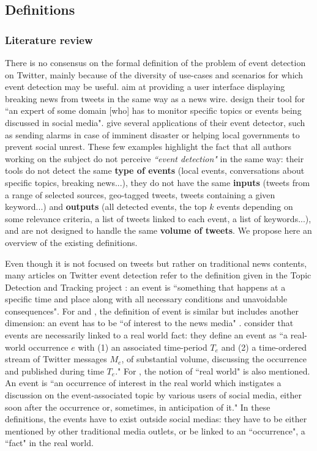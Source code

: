 \subsection{Definitions \label{Subsec: Definitions}}


\subsubsection{Literature review}
			There is no consensus on the formal definition of the problem of event detection on Twitter, mainly because of the diversity of use-cases and scenarios for which event detection may be useful. \citet{sankaranarayanan_twitterstand:_2009} aim at providing a user interface displaying breaking news from tweets in the same way as a news wire. \citet{aiello_sensing_2013} design their tool for ``an expert of some domain [who] has to monitor specific topics or events being discussed in social media". \citet{zhang_triovecevent:_2017} give several applications of their event detector, such as sending alarms in case of imminent disaster or helping local governments to prevent social unrest. These few examples highlight the fact that all authors working on the subject do not perceive \textit{``event detection"} in the same way: their tools do not detect the same \textbf{type of events} (local events, conversations about specific topics, breaking news...), they do not have the same \textbf{inputs} (tweets from a range of selected sources, geo-tagged tweets, tweets containing a given keyword...) and \textbf{outputs} (all detected events, the top $k$ events depending on some relevance criteria, a list of tweets linked to each event, a list of keywords...), and are not designed to handle the same \textbf{volume of tweets}. We propose here an overview of the existing definitions.
			
Even though it is not focused on tweets but rather on traditional news contents, many articles on Twitter event detection refer to the definition given in the Topic Detection and Tracking project \citep{allan_introduction_2002}: an event is ``something that happens at a specific time and place along with all necessary conditions and unavoidable consequences". 
For \citet{aggarwal_event_2012} and \citet{mcminn_building_2013}, the definition of event is similar but includes another dimension: an event has to be ``of interest to the news media" \citep{aggarwal_event_2012}.
\citet{becker_beyond_2011} consider that events are necessarily linked to a real world fact: they define an event as ``a real-world occurrence $e$ with (1) an associated time-period $T_e$ and (2) a time-ordered stream of Twitter messages $M_e$, of substantial volume, discussing the occurrence and published during time $T_e$."  
 For \citet{hasan_survey_2018}, the notion of ``real world" is also mentioned. An event is ``an occurrence of interest in the real world which instigates a discussion on the event-associated topic by various users of social media, either soon after the occurrence or, sometimes, in anticipation of it." 
 In these definitions, the events have to exist outside social medias: they have to be either mentioned by other traditional media outlets, or be linked to an ``occurrence", a ``fact" in the real world.
 
